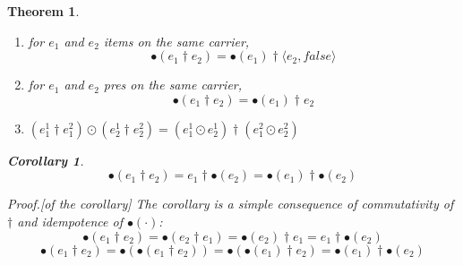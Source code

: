 \documentclass[preprint]{sigplanconf}
\newcommand{\false}{\mathit{false}}
\newcounter{item}
\newtheorem{theorem}[item]{Theorem}
\newtheorem{corollary}[item]{Corollary}
\newenvironment{proof}{\begin{trivlist}\item[]{\em Proof.}}{\end{trivlist}}
\begin{document}
\begin{theorem}~

\begin{enumerate}
\item for $e_1$ and $e_2$ items on the same carrier,
$$\bullet(e_1 \dagger e_2) = \bullet(e_1) \dagger \langle e_2,\false \rangle$$
\item for $e_1$ and $e_2$ pres on the same carrier,
$$\bullet(e_1 \dagger e_2) = \bullet(e_1) \dagger e_2$$
\item
$(e^1_1 \dagger e^2_1) \odot (e^1_2 \dagger e^2_2) =
  (e^1_1 \odot e^1_2) \dagger (e^2_1 \odot e^2_2)$
\end{enumerate}
\begin{corollary}
$$\bullet(e_1 \dagger e_2) = e_1 \dagger \bullet(e_2) = \bullet(e_1) \dagger \bullet(e_2)$$
\end{corollary}
\begin{proof}[of the corollary]
The corollary is a simple consequence of commutativity of $\dagger$ and
idempotence of $\bullet(\cdot)$:
$$\bullet(e_1 \dagger e_2) = \bullet(e_2 \dagger e_1) = \bullet(e_2) \dagger e_1 = e_1 \dagger \bullet(e_2)$$
$$\bullet(e_1 \dagger e_2) =
\bullet(\bullet(e_1 \dagger e_2)) =
\bullet(\bullet(e_1) \dagger e_2) =
\bullet(e_1) \dagger \bullet(e_2)
$$
\end{proof}
\end{theorem}
\end{document}
